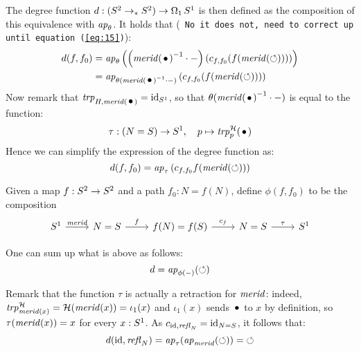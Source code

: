 \documentclass[english,a4]{article}
\begin{document}
The degree function $d: (\Sp \ptdto \Sp) \to \loopspace 1 \Sc$ is then
defined as the composition of this equivalence with $\ap\theta$. It
holds that ({\tt \color{red} No it does not, need to correct up until
  equation (\ref{eq:15})}):
\begin{align}
  \label{eq:21}
  d(f,f_0)
  &=
    \ap\theta\left(
    \left(
    \inv{\mrd(\base)} \cdot \blank
    \right)
    \left(
    c_{f,f_0}(f(\mrd(\Sloop)))
    \right)
    \right)
  \\
  &= \ap{\theta(\inv{\mrd(\base)} \cdot \blank)}
    \left(
    c_{f,f_0}(f(\mrd(\Sloop)))
    \right)
\end{align}
Now remark that $\trp{H,\mrd(\base)} = \id_\Sc$, so that
$\theta(\inv{\mrd(\base)}\cdot \blank)$ is equal to the function:
\begin{equation}
  \label{eq:22}
  \tau : (N=S) \to \Sc, \quad p \mapsto \trp[\hopffam]{p}(\base)
\end{equation}
Hence we can simplify the expression of the degree function as:
\begin{equation}
  \label{eq:23}
  d(f,f_0) = \ap\tau\left(c_{f,f_0}f(\mrd(\Sloop))\right)
\end{equation}

\begin{definition}
  Given a map $f\from \Sp \to \Sp$ and a path $f_0 : N = f(N)$, define
  $\phi(f,f_0)$ to be the composition
  \begin{equation}
    \label{eq:13}
    \begin{tikzcd}
      \Sc \rar["\mrd"] & N=S \rar["f"] & f(N) = f(S) \rar["c_f"] & N =
      S \rar["\tau"] & \Sc
    \end{tikzcd}
  \end{equation}
\end{definition}
One can sum up what is above as follows:
\begin{equation}
  \label{eq:15}
  d = \ap{\phi(\blank)}(\Sloop)
\end{equation}

Remark that the function $\tau$ is actually a retraction for $\mrd$:
indeed, $\trp[\hopffam]{\mrd(x)} = \hopffam (\mrd(x)) = \iota_1(x)$
and $\iota_1(x)$ sends $\base$ to $x$ by definition, so
$\tau(\mrd(x)) = x$ for every $x:\Sc$. As $c_{\id,\refl N}=\id_{N=S}$,
it follows that:
\begin{equation}
  d(\id, \refl N) = \ap\tau(\ap\mrd(\Sloop)) = \Sloop
\end{equation}
\end{document}
